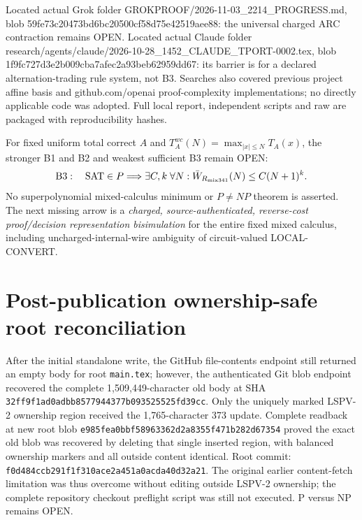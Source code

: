 \documentclass[11pt]{article}
\begin{document}
Located actual Grok folder GROKPROOF/2026-11-03_2214_PROGRESS.md, blob 59fe73c20473bd6bc20500cf58d75e42519aee88: the universal charged ARC contraction remains OPEN. Located actual Claude folder research/agents/claude/2026-10-28_1452_CLAUDE_TPORT-0002.tex, blob 1f9fc727d3e2b009cba7afec2a93beb62959dd67: its barrier is for a declared alternation-trading rule system, not B3. Searches also covered previous project affine basis and github.com/openai proof-complexity implementations; no directly applicable code was adopted. Full local report, independent scripts and raw are packaged with reproducibility hashes.

For fixed uniform total correct $A$ and $T_A^{wc}(N)=\max_{|x|\le N}T_A(x)$, the stronger B1 and B2 and weakest sufficient B3 remain OPEN:
\[
{\rm B3}:\quad {\rm SAT}\in P\Longrightarrow
\exists C,k\;\forall N:\bar W_{R_{\rm mix341}}(N)\le C(N+1)^k.
\]
No superpolynomial mixed-calculus minimum or $P\ne NP$ theorem is asserted. The next missing arrow is a \emph{charged, source-authenticated, reverse-cost proof/decision representation bisimulation} for the entire fixed mixed calculus, including uncharged-internal-wire ambiguity of circuit-valued LOCAL-CONVERT. 

\section*{Post-publication ownership-safe root reconciliation}
After the initial standalone write, the GitHub file-contents endpoint still returned
an empty body for root \texttt{main.tex}; however, the authenticated Git blob
endpoint recovered the complete 1,509,449-character old body at
SHA \texttt{32ff9f1ad0adbb8577944377b093525525fd39cc}.
Only the uniquely marked LSPV-2 ownership region received the 1,765-character
373 update. Complete readback at new root blob
\texttt{e985fea0bbf58963362d2a8355f471b282d67354}
proved the exact old blob was recovered by deleting that single inserted region,
with balanced ownership markers and all outside content identical.
Root commit: \texttt{f0d484ccb291f1f310ace2a451a0acda40d32a21}.
The original earlier content-fetch limitation was thus overcome without
editing outside LSPV-2 ownership; the complete repository checkout
preflight script was still not executed. P versus NP remains OPEN.
\end{document}
